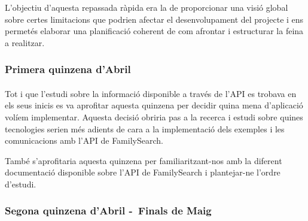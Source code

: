             L'objectiu d'aquesta repassada ràpida era la de proporcionar una visió global sobre certes limitacions que podrien afectar el desenvolupament del projecte i ens permetés elaborar una planificació coherent de com afrontar i estructurar la feina a realitzar.

        \subsubsection{Primera quinzena d'Abril}

            \paragraph{}
            Tot i que l’estudi sobre la informació disponible a través de l’API es trobava en els seus inicis es va aprofitar aquesta quinzena per decidir quina mena d’aplicació volíem implementar. Aquesta decisió obriria pas a la recerca i estudi sobre quines tecnologies serien més adients de cara a la implementació dels exemples i les comunicacions amb l'API de FamilySearch.

            També s'aprofitaria aquesta quinzena per familiaritzant-nos amb la diferent documentació disponible sobre l'API de FamilySearch i plantejar-ne l’ordre d'estudi.

        \subsubsection{Segona quinzena d'Abril -\ Finals de Maig}

            \paragraph{}
            
